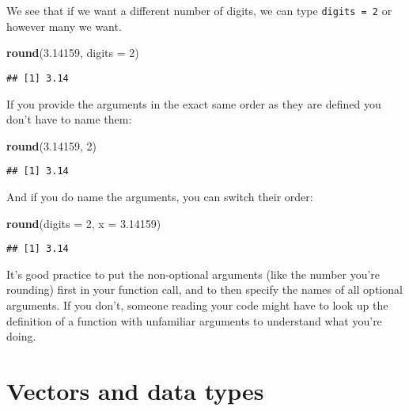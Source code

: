 \documentclass[]{book}
\newenvironment{Shaded}{\begin{snugshade}}{\end{snugshade}}
\newcommand{\DataTypeTok}[1]{\textcolor[rgb]{0.13,0.29,0.53}{#1}}
\newcommand{\DecValTok}[1]{\textcolor[rgb]{0.00,0.00,0.81}{#1}}
\newcommand{\FloatTok}[1]{\textcolor[rgb]{0.00,0.00,0.81}{#1}}
\newcommand{\KeywordTok}[1]{\textcolor[rgb]{0.13,0.29,0.53}{\textbf{#1}}}
\newcommand{\NormalTok}[1]{#1}
\begin{document}
We see that if we want a different number of digits, we can type \texttt{digits\ =\ 2} or however many we want.

\begin{Shaded}
\begin{Highlighting}[]
\KeywordTok{round}\NormalTok{(}\FloatTok{3.14159}\NormalTok{, }\DataTypeTok{digits =} \DecValTok{2}\NormalTok{)}
\end{Highlighting}
\end{Shaded}

\begin{verbatim}
## [1] 3.14
\end{verbatim}

If you provide the arguments in the exact same order as they are defined you don't have to name them:

\begin{Shaded}
\begin{Highlighting}[]
\KeywordTok{round}\NormalTok{(}\FloatTok{3.14159}\NormalTok{, }\DecValTok{2}\NormalTok{)}
\end{Highlighting}
\end{Shaded}

\begin{verbatim}
## [1] 3.14
\end{verbatim}

And if you do name the arguments, you can switch their order:

\begin{Shaded}
\begin{Highlighting}[]
\KeywordTok{round}\NormalTok{(}\DataTypeTok{digits =} \DecValTok{2}\NormalTok{, }\DataTypeTok{x =} \FloatTok{3.14159}\NormalTok{)}
\end{Highlighting}
\end{Shaded}

\begin{verbatim}
## [1] 3.14
\end{verbatim}

It's good practice to put the non-optional arguments (like the number you're rounding) first in your function call, and to then specify the names of all optional arguments. If you don't, someone reading your code might have to look up the definition of a function with unfamiliar arguments to understand what you're doing.

\hypertarget{vectors-and-data-types}{%
\section{Vectors and data types}\label{vectors-and-data-types}}
\end{document}
